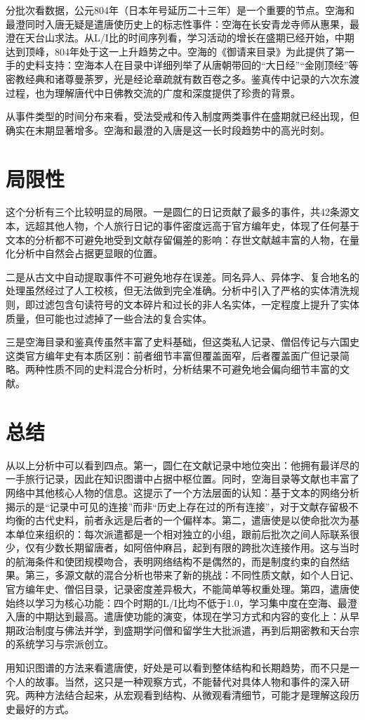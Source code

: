 \documentclass[12pt,a4paper]{article}
\begin{document}
分批次看数据，公元804年（日本年号延历二十三年）是一个重要的节点。空海和最澄同时入唐无疑是遣唐使历史上的标志性事件：空海在长安青龙寺师从惠果，最澄在天台山求法。从L/I比的时间序列看，学习活动的增长在盛期已经开始，中期达到顶峰，804年处于这一上升趋势之中。空海的《御请来目录》为此提供了第一手的史料支持：空海本人在目录中详细列举了从唐朝带回的“大日经”“金刚顶经”等密教经典和诸尊曼荼罗，光是经论章疏就有数百卷之多。鉴真传中记录的六次东渡过程，也为理解唐代中日佛教交流的广度和深度提供了珍贵的背景。

从事件类型的时间分布来看，受法受戒和传入制度两类事件在盛期就已经出现，但确实在末期显著增多。空海和最澄的入唐是这一长时段趋势中的高光时刻。

\section{局限性}

这个分析有三个比较明显的局限。一是圆仁的日记贡献了最多的事件，共42条源文本，远超其他人物，个人旅行日记的事件密度远高于官方编年史，体现了任何基于文本的分析都不可避免地受到文献存留偏差的影响：存世文献越丰富的人物，在量化分析中自然会占据更显眼的位置。

二是从古文中自动提取事件不可避免地存在误差。同名异人、异体字、复合地名的处理虽然经过了人工校核，但无法做到完全准确。分析中引入了严格的实体清洗规则，即过滤包含句读符号的文本碎片和过长的非人名实体，一定程度上提升了实体质量，但可能也过滤掉了一些合法的复合实体。

三是空海目录和鉴真传虽然丰富了史料基础，但这类私人记录、僧侣传记与六国史这类官方编年史有本质区别：前者细节丰富但覆盖面窄，后者覆盖面广但记录简略。两种性质不同的史料混合分析时，分析结果不可避免地会偏向细节丰富的文献。

\section{总结}

从以上分析中可以看到四点。第一，圆仁在文献记录中地位突出：他拥有最详尽的一手旅行记录，因此在知识图谱中占据中枢位置。同时，空海目录等文献也丰富了网络中其他核心人物的信息。这提示了一个方法层面的认知：基于文本的网络分析揭示的是“记录中可见的连接”而非“历史上存在过的所有连接”，对于文献存留极不均衡的古代史料，前者永远是后者的一个偏样本。第二，遣唐使是以使命批次为基本单位来组织的：每次派遣都是一个相对独立的小组，跟前后批次之间人际联系很少，仅有少数长期留唐者，如阿倍仲麻吕，起到有限的跨批次连接作用。这与当时的航海条件和使团规模吻合，表明网络结构不是偶然的，而是制度约束的自然结果。第三，多源文献的混合分析也带来了新的挑战：不同性质文献，如个人日记、官方编年史、僧侣目录，记录密度差异极大，不能简单等权重处理。第四，遣唐使始终以学习为核心功能：四个时期的L/I比均不低于1.0，学习集中度在空海、最澄入唐的中期达到最高。遣唐使功能的演变，体现在学习方式和内容的变化上：从早期政治制度与佛法并学，到盛期学问僧和留学生大批派遣，再到后期密教和天台宗的系统学习与宗派创立。

用知识图谱的方法来看遣唐使，好处是可以看到整体结构和长期趋势，而不只是一个人的故事。当然，这只是一种观察方式，不能替代对具体人物和事件的深入研究。两种方法结合起来，从宏观看到结构、从微观看清细节，可能才是理解这段历史最好的方式。
\end{document}
